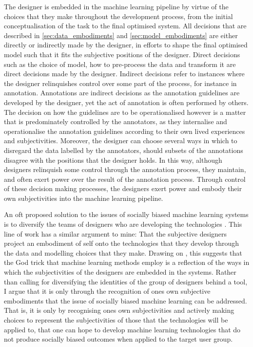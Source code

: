 {The designer is embedded in the machine learning pipeline by virtue of the choices that they make throughout the development process, from the initial conceptualisation of the task to the final optimised system.
All decisions that are described in \cref{sec:data_embodiments} and \cref{sec:model_embodiments} are either directly or indirectly made by the designer, in efforts to shape the final optimised model such that it fits the subjective positions of the designer.
Direct decisions such as the choice of model, how to pre-process the data and transform it are direct decisions made by the designer.
Indirect decisions refer to instances where the designer relinquishes control over some part of the process, for instance in annotation.
Annotations are indirect decisions as the annotation guidelines are developed by the designer, yet the act of annotation is often performed by others.
The decision on how the guidelines are to be operationalised however is a matter that is predominately controlled by the annotators, as they internalise and operationalise the annotation guidelines according to their own lived experiences and subjectivities.
Moreover, the designer can choose several ways in which to disregard the data labelled by the annotators, should subsets of the annotations disagree with the positions that the designer holds.
In this way, although designers relinquish some control through the annotation process, they maintain, and often exert power over the result of the annotation process.
Through control of these decision making processes, the designers exert power and embody their own subjectivities into the machine learning pipeline.

An oft proposed solution to the issues of socially biased machine learning systems is to diversify the teams of designers who are developing the technologies \citep{Holstein:2019}.
This line of work has a similar argument to mine: That the subjective designers project an embodiment of self onto the technologies that they develop through the data and modelling choices that they make.
Drawing on \citet{Haraway:1988}, this suggests that the God trick that machine learning methods employ is a reflection of the ways in which the subjectivities of the designers are embedded in the systems.
Rather than calling for diversifying the identities of the group of designers behind a tool, I argue that it is only through the recognition of ones own subjective embodiments that the issue of socially biased machine learning can be addressed.
That is, it is only by recognising ones own subjectivities and actively making choices to represent the subjectivities of those that the technologies will be applied to, that one can hope to develop machine learning technologies that do not produce socially biased outcomes when applied to the target user group.

}
